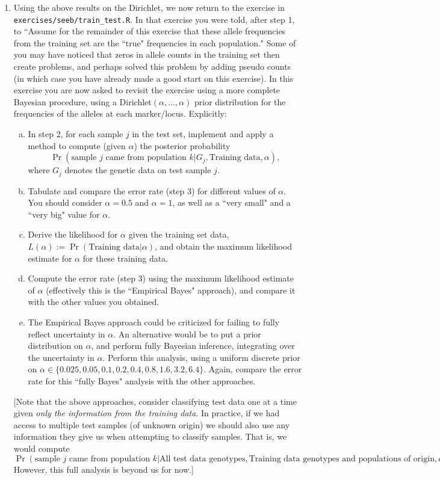 \documentclass[12pt]{article}
\def\train{\text{Training data}}
\begin{document}
\begin{enumerate}
\item Using the above results on the Dirichlet, we now return to the exercise in \verb|exercises/seeb/train_test.R|. In that exercise you were told, after step 1, to ``Assume for the remainder of this exercise that these allele frequencies from the training set are the ``true" frequencies in each population." Some of you may have noticed that zeros in allele
counts in the training set then create problems, and perhaps solved this problem by adding pseudo counts (in which case you have already
made a good start on this exercise). In this exercise you are now asked to revisit the exercise using a more complete Bayesian procedure, 
using a Dirichlet$(\alpha,\dots,\alpha)$ prior distribution for the frequencies of the alleles at each marker/locus. Explicitly:
\begin{enumerate}[a)]
\item In step 2, for each sample $j$ in the test set, implement and apply a method to compute (given $\alpha$) the posterior probability 
$$\Pr(\text{sample $j$ came from population $k$} | G_j, \text{Training data}, \alpha),$$ 
where $G_j$ denotes the genetic data on test sample $j$. 
\item  Tabulate and compare the error rate (step 3) for different values of $\alpha$. 
You should consider $\alpha=0.5$ and $\alpha=1$, as well as a ``very small" and a ``very big" value for $\alpha$.
\item Derive the likelihood for $\alpha$ given the training set data, $L(\alpha) :=\Pr(\train | \alpha)$, and obtain the maximum likelihood estimate for $\alpha$
for these training data.
\item Compute the error rate (step 3) using the maximum likelihood estimate of $\alpha$ (effectively this is the ``Empirical Bayes" approach), and compare it with the other values you obtained.
\item The Empirical Bayes approach could be criticized for failing to fully reflect uncertainty in $\alpha$. An alternative would be to put a prior distribution on $\alpha$, and perform 
fully Bayesian inference, integrating over the uncertainty in $\alpha$. Perform this analysis, using a uniform discrete prior on $\alpha \in \{0.025,0.05,0.1,0.2,0.4,0.8,1.6,3.2,6.4\}$. Again, compare the error rate for this ``fully Bayes" analysis with the other approaches. 
\end{enumerate}
 [Note that the above approaches, consider classifying test data one at a time given {\it only the information from the training data}.
 In practice, if we had access to multiple test samples (of unknown origin) we should also use any information they
 give us when attempting to classify samples. That is, we would
compute 
$$\Pr(\text{sample $j$ came from population $k$} | \text{All test data genotypes}, \text{Training data genotypes and populations of origin},\alpha).$$ However, this full analysis is beyond us for now.]



\end{enumerate}
\end{document}
